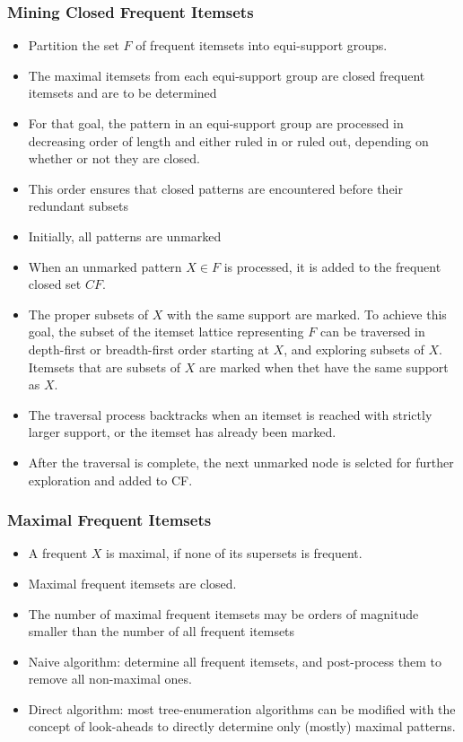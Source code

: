 \documentclass[../notes.tex]{subfiles}
\begin{document}
\subsubsection{Mining Closed Frequent Itemsets}
\begin{itemize} 
  \item Partition the set $F$ of frequent itemsets into equi-support groups.
  \item The maximal itemsets from each equi-support group are closed frequent itemsets and are to be determined
  \item For that goal, the pattern in an equi-support group are processed in decreasing order of length and either ruled in or ruled out, depending on whether or not they are closed.
  \item This order ensures that closed patterns are encountered before their redundant subsets
  \item Initially, all patterns are unmarked
  \item When an unmarked pattern $X \in F$ is processed, it is added to the frequent closed set $CF$.
  \item The proper subsets of $X$ with the same support are marked. To achieve this goal, the subset of the itemset lattice representing $F$ can be traversed in depth-first or breadth-first order starting at $X$, and exploring subsets of $X$. Itemsets that are subsets of $X$ are marked when thet have the same support as $X$.
  \item The traversal process backtracks when an itemset is reached with strictly larger support, or the itemset has already been marked.
  \item After the traversal is complete, the next unmarked node is selcted for further exploration and added to CF.
\end{itemize}

\subsubsection{Maximal Frequent Itemsets}
\begin{itemize} 
  \item A frequent $X$ is maximal, if none of its supersets is frequent.
  \item Maximal frequent itemsets are closed.
  \item The number of maximal frequent itemsets may be orders of magnitude smaller than the number of all frequent itemsets
  \item Naive algorithm: determine all frequent itemsets, and post-process them to remove all non-maximal ones.
  \item Direct algorithm: most tree-enumeration algorithms can be modified with the concept of look-aheads to directly determine only (mostly) maximal patterns.
\end{itemize}
\end{document}
